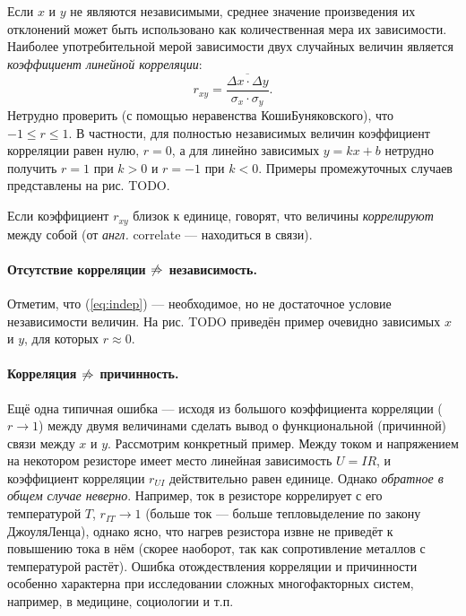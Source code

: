 \documentclass[10pt]{article}
\begin{document}
Если $x$ и $y$ не являются независимыми, среднее значение произведения
их отклонений может быть использовано как количественная мера их зависимости.
Наиболее употребительной мерой зависимости двух случайных величин
является \emph{коэффициент линейной корреляции}:
\begin{equation}
r_{xy}=\frac{\overline{\Delta x\cdot\Delta y}}{\sigma_{x}\cdot\sigma_{y}}.\label{eq:pearson}
\end{equation}
Нетрудно проверить (с помощью неравенства Коши\textendash Буняковского),
что $-1\le r\le1$. В частности, для полностью независимых величин
коэффициент корреляции равен нулю, $r=0$, а для линейно зависимых
$y=kx+b$ нетрудно получить $r=1$ при $k>0$ и $r=-1$ при $k<0$.
Примеры промежуточных случаев представлены на рис. TODO.

Если коэффициент $r_{xy}$ близок к единице, говорят, что величины
\emph{коррелируют} между собой (от \emph{англ.} correlate ---
находиться в связи).

\paragraph{Отсутствие корреляции $\protect\not\Rightarrow$ независимость.}

{\small{}Отметим, что (\ref{eq:indep}) --- необходимое,
но не достаточное условие независимости величин. На рис. TODO приведён
пример очевидно зависимых $x$ и $y$, для которых $r\approx0$.}{\small\par}

\paragraph{Корреляция $\protect\not\Rightarrow$ причинность.}

{\small{}Ещё одна типичная ошибка --- исходя из большого
коэффициента корреляции ($r\to1$) между двумя величинами сделать
вывод о функциональной (причинной) связи между $x$ и $y$. Рассмотрим
конкретный пример. Между током и напряжением на некотором резисторе
имеет место линейная зависимость $U=IR$, и коэффициент корреляции
$r_{UI}$ действительно равен единице. Однако }\emph{\small{}обратное
в общем случае неверно}{\small{}. Например, ток в резисторе коррелирует
с его температурой $T$, $r_{IT}\to1$ (больше ток --- больше
тепловыделение по закону Джоуля\textendash Ленца), однако ясно, что
нагрев резистора извне не приведёт к повышению тока в нём (скорее
наоборот, так как сопротивление металлов с температурой растёт). Ошибка
отождествления корреляции и причинности особенно характерна при исследовании
сложных многофакторных систем, например, в медицине, социологии и
т.п.}{\small\par}
\end{document}
